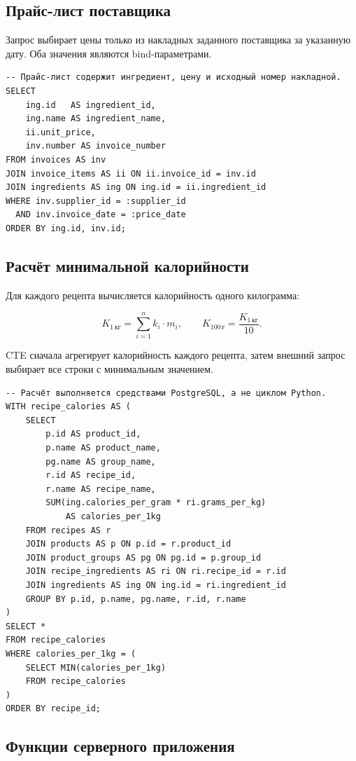 \documentclass[14pt,a4paper]{extarticle}
\begin{document}
\subsection{Прайс-лист поставщика}

Запрос выбирает цены только из накладных заданного поставщика за указанную
дату. Оба значения являются bind-параметрами.

\begin{verbatim}
-- Прайс-лист содержит ингредиент, цену и исходный номер накладной.
SELECT
    ing.id   AS ingredient_id,
    ing.name AS ingredient_name,
    ii.unit_price,
    inv.number AS invoice_number
FROM invoices AS inv
JOIN invoice_items AS ii ON ii.invoice_id = inv.id
JOIN ingredients AS ing ON ing.id = ii.ingredient_id
WHERE inv.supplier_id = :supplier_id
  AND inv.invoice_date = :price_date
ORDER BY ing.id, inv.id;
\end{verbatim}

\subsection{Расчёт минимальной калорийности}

Для каждого рецепта вычисляется калорийность одного килограмма:

\[
K_{1\,\text{кг}}=\sum_{i=1}^{n} k_i \cdot m_i,
\qquad
K_{100\,\text{г}}=\frac{K_{1\,\text{кг}}}{10}.
\]

CTE сначала агрегирует калорийность каждого рецепта, затем внешний запрос
выбирает все строки с минимальным значением.

\begin{verbatim}
-- Расчёт выполняется средствами PostgreSQL, а не циклом Python.
WITH recipe_calories AS (
    SELECT
        p.id AS product_id,
        p.name AS product_name,
        pg.name AS group_name,
        r.id AS recipe_id,
        r.name AS recipe_name,
        SUM(ing.calories_per_gram * ri.grams_per_kg)
            AS calories_per_1kg
    FROM recipes AS r
    JOIN products AS p ON p.id = r.product_id
    JOIN product_groups AS pg ON pg.id = p.group_id
    JOIN recipe_ingredients AS ri ON ri.recipe_id = r.id
    JOIN ingredients AS ing ON ing.id = ri.ingredient_id
    GROUP BY p.id, p.name, pg.name, r.id, r.name
)
SELECT *
FROM recipe_calories
WHERE calories_per_1kg = (
    SELECT MIN(calories_per_1kg)
    FROM recipe_calories
)
ORDER BY recipe_id;
\end{verbatim}

\subsection{Функции серверного приложения}
\end{document}
